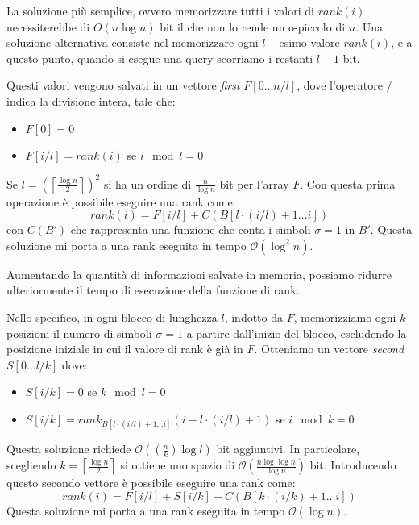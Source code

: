 La soluzione più semplice, ovvero memorizzare tutti i valori di $rank(i)$
necessiterebbe di $O(n \log n)$ bit il che non lo rende un o-piccolo di $n$. Una
soluzione alternativa consiste nel memorizzare ogni $l-$esimo valore $rank(i)$,
e a questo punto, quando si esegue una query scorriamo i restanti $l - 1$ bit.

Questi valori vengono salvati in un vettore \textit{first} $F[0 \dots n / l]$,
dove l'operatore $/$ indica la divisione intera, tale che:
\begin{itemize}
    \item $F[0] = 0$
    \item $F[i / l] = rank(i)$ se $i \mod l = 0$
\end{itemize}
Se $l = \left(\left\lceil \frac{\log n}{2} \right\rceil \right)^2$ si ha un ordine
di $\frac{n}{\log n}$ bit per l'array $F$. Con questa prima operazione è possibile
eseguire una rank come:
\begin{equation}
    rank(i) = F[i/l] + C(B[l \cdot (i / l) + 1 \dots i])
\end{equation}
con $C(B')$ che rappresenta una funzione che conta i simboli $\sigma = 1$ in $B'$.
Questa soluzione mi porta a una rank eseguita in tempo $\mathcal{O}(\log^2 n)$.

Aumentando la quantità di informazioni salvate in memoria, possiamo ridurre
ulteriormente il tempo di esecuzione della funzione di rank.

Nello specifico, in ogni blocco di lunghezza $l$, indotto da $F$, memorizziamo
ogni $k$ posizioni il numero di simboli $\sigma = 1$ a partire dall'inizio del
blocco, escludendo la posizione iniziale in cui il valore di rank è già in $F$.
Otteniamo un vettore \textit{second} $S[0 \dots l /k]$ dove:
\begin{itemize}
    \item $S[i / k] = 0$ se $k \mod l = 0$
    \item $S[i / k] = rank_{B[l \cdot (i / l) + 1 \dots i]} (i - l \cdot (i / l)
              + 1)$ se $i \mod k = 0$
\end{itemize}
Questa soluzione richiede $\mathcal{O}\left(\left(\frac{n}{k}\right) \log l\right)$
bit aggiuntivi. In particolare, scegliendo $k = \left\lceil \frac{\log n}{2}
    \right\rceil$ si ottiene uno spazio di $\mathcal{O}(\frac{n \log \log n}{\log n})$
bit. Introducendo questo secondo vettore è possibile eseguire una rank come:
\begin{equation}
    rank(i) = F[i / l] + S[i / k] + C(B[k \cdot (i / k) + 1 \dots i])
\end{equation}
Questa soluzione mi porta a una rank eseguita in tempo $\mathcal{O}(\log n)$.

